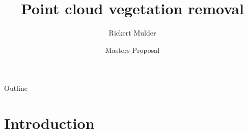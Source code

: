 \documentclass[compress]{beamer}
\title{Point cloud vegetation removal}
\author{Rickert Mulder}
\institute[U of X]
{
  Department of Computer Science\\
  University of Cape Town
}
\date[CFP 2003] %
{Masters Proposal}
\begin{document}
\begin{frame}
  \titlepage
\end{frame}

\begin{frame}{Outline}
  \tableofcontents
\end{frame}





\section{Introduction}
\end{document}
